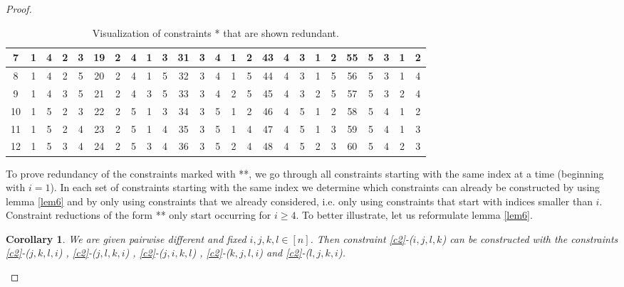 \documentclass{scrartcl}
\newtheorem{corollary}{Corollary}
\theoremstyle{plain}
\begin{document}
\begin{proof}
\begin{table}[h!]
{\begin{tabular}{||c | c c c c||c | c c c c||c | c c c c||c | c c c c||c | c c c c||}
			\hline
			7 & 1 & 4 & 2 & 3 & 19 & 2 & 4 & 1 & 3 & 31 & 3 & 4 & 1 & 2 & 43 & 4 & 3 & 1 & 2 & 55 & 5 & 3 & 1 & 2 \\ 
			\hline
			8 & 1 & 4 & 2 & 5 & 20 & 2 & 4 & 1 & 5 & 32 & 3 & 4 & 1 & 5 & 44 & 4 & 3 & 1 & 5 & 56 & 5 & 3 & 1 & 4 \\ 
			\hline
			9 & \cellcolor{red!25}1 & \cellcolor{red!25}4 & \cellcolor{red!25}3 & \cellcolor{red!25}5 & 21 & \cellcolor{red!25}2 & \cellcolor{red!25}4 & \cellcolor{red!25}3 & \cellcolor{red!25}5 & 33 & \cellcolor{red!25}3 & \cellcolor{red!25}4 & \cellcolor{red!25}2 & \cellcolor{red!25}5 & 45 & \cellcolor{red!25}4 & \cellcolor{red!25}3 & \cellcolor{red!25}2 & \cellcolor{red!25}5 & 57 & \cellcolor{red!25}5 & \cellcolor{red!25}3 & \cellcolor{red!25}2 & \cellcolor{red!25}4 \\ 
			\hline
			10 & 1 & 5 & 2 & 3 & 22 & 2 & 5 & 1 & 3 & 34 & 3 & 5 & 1 & 2 & 46 & 4 & 5 & 1 & 2 & 58 & 5 & 4 & 1 & 2 \\ 
			\hline
			11 & 1 & 5 & 2 & 4 & 23 & 2 & 5 & 1 & 4 & 35 & 3 & 5 & 1 & 4 & 47 & 4 & 5 & 1 & 3 & 59 & 5 & 4 & 1 & 3 \\ 
			\hline
			12 & \cellcolor{red!25}1 & \cellcolor{red!25}5 & \cellcolor{red!25}3 & \cellcolor{red!25}4 & 24 & \cellcolor{red!25}2 & \cellcolor{red!25}5 & \cellcolor{red!25}3 & \cellcolor{red!25}4 & 36 & \cellcolor{red!25}3 & \cellcolor{red!25}5 & \cellcolor{red!25}2 & \cellcolor{red!25}4 & 48 & \cellcolor{red!25}4 & \cellcolor{red!25}5 & \cellcolor{red!25}2 & \cellcolor{red!25}3 & 60 & \cellcolor{red!25}5 & \cellcolor{red!25}4 & \cellcolor{red!25}2 & \cellcolor{red!25}3 \\ 
			\hline
		\end{tabular}%
	}
	\caption{Visualization of constraints * that are shown redundant.}
\end{table}
	
	
	To prove redundancy of the constraints marked with **, we go through all constraints starting with the same index at a time (beginning with $i=1$). In each set of constraints starting with the same index we determine which constraints can already be constructed by using lemma \ref{lem6} and by only using constraints that we already considered, i.e. only using constraints that start with indices smaller than $i$. Constraint reductions of the form ** only start occurring for $i \geq 4$. To better illustrate, let us reformulate lemma \ref{lem6}.
	
	\begin{mdframed}
	\begin{corollary}\label{cor1}
		We are given pairwise different and fixed $i,j,k,l \in [n]$. Then constraint \eqref{c2}-($i,j,l,k$) can be constructed with the constraints \eqref{c2}-($j,k,l,i$) , \eqref{c2}-($j,l,k,i$) , \eqref{c2}-($j,i,k,l$) , \eqref{c2}-($k,j,l,i$) and \eqref{c2}-($l,j,k,i$).
	\end{corollary}
	\vspace{7pt}
	\end{mdframed}
	

\end{proof}
\end{document}
